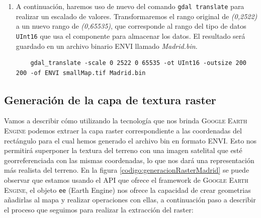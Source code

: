 \documentclass[a4paper, 11pt]{book}
\begin{document}
\begin{enumerate}
    \item A continuación, haremos uso de nuevo del comando \texttt{gdal translate} para realizar un escalado de valores. Transformaremos el rango original de \emph{(0,2522)} a un nuevo rango de \emph{(0,65535)}, que corresponde al rango del tipo de datos \texttt{UInt16} que usa el componente para almacenar los datos. El resultado será guardado en un archivo binario \textsc{ENVI} llamado \emph{Madrid.bin}.

    {\scriptsize
    \begin{verbatim}
    gdal_translate -scale 0 2522 0 65535 -ot UInt16 -outsize 200 200 -of ENVI smallMap.tif Madrid.bin
    \end{verbatim}
    }
\end{enumerate}

\subsection{Generación de la capa de textura raster}
\label{sec:raster}
Vamos a describir cómo utilizando la tecnología que nos brinda \textsc{Google Earth Engine} podemos extraer la capa \gls{raster} correspondiente a las coordenadas del rectángulo para el cual hemos generado el archivo bin en formato \textsc{ENVI}. Esto nos permitirá superponer la textura del terreno con una imagen satelital que esté georreferenciada con las mismas coordenadas, lo que nos dará una representación más realista del terreno.
En la figura \ref{codigo:generacionRasterMadrid} se puede observar que estamos usando el \textsc{API} que ofrece el \gls{framework} de \textsc{Google Earth Engine}, el objeto \texttt{ee} (Earth Engine) nos ofrece la capacidad de crear geometrias añadirlas al mapa y realizar operaciones con ellas, a continuación paso a describir el proceso que seguimos para realizar la extracción del raster:
\end{document}
